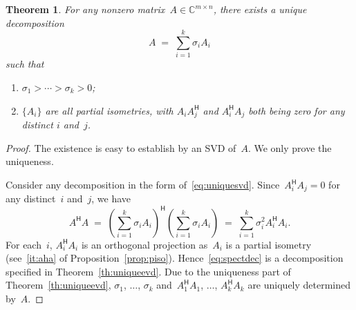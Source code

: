 \documentclass[11pt,a4paper]{article}  %
\numberwithin{equation}{section}
\newtheorem{theorem}{Theorem}%
\theoremstyle{definition}
\def\CC{\mathbb{C}}
\newcommand{\hmt}{{\scriptscriptstyle{{\mathsf{H}}}}}
\begin{document}
\begin{theorem}
  \label{th:uniquesvd}
  For any nonzero matrix~$A\in\CC^{m\times n}$, there exists a unique decomposition
  \begin{equation}
    \label{eq:uniquesvd}
    A \;=\; \sum_{i=1}^k \sigma_i A_i
  \end{equation}
  such that
  \begin{enumerate}[leftmargin=1.5em]
    \item $\sigma_1>\cdots >\sigma_k> 0$;
    \item $\{A_i\}$ are all partial isometries, with
    $A_i A_j^\hmt$ and $A_i^\hmt A_j$ both being zero for any distinct $i$ and~$j$.
  \end{enumerate}
\end{theorem}

\begin{proof}
  The existence is easy to establish by an SVD of~$A$. We only prove the
  uniqueness.

  Consider any decomposition in the form of~\eqref{eq:uniquesvd}.
  Since~$A_i^\hmt A_j = 0$ for any distinct~$i$ and~$j$, we have
  \begin{equation}
    \label{eq:spectdec}
    A^\hmt A \;=\;
    \left(\sum_{i=1}^k \sigma_iA_i\right)^\hmt
    \left(\sum_{i=1}^k \sigma_iA_i\right)
    \;=\; \sum_{i=1}^k \sigma_i^2 A_i^\hmt A_i.
  \end{equation}
  For each~$i$, $A_i^\hmt A_i$ is an orthogonal projection as~$A_i$ is a partial isometry (see~\ref{it:aha} of
  Proposition~\ref{prop:piso}).
  Hence~\eqref{eq:spectdec} is a decomposition specified in Theorem~\ref{th:uniqueevd}. Due to the
  uniqueness part of Theorem~\ref{th:uniqueevd}, $\sigma_1$, $\dots$,
  $\sigma_k$ and~$A_1^\hmt A_1$, $\dots$, $A_k^\hmt A_k$  are uniquely determined by~$A$.


\end{proof}
\end{document}
